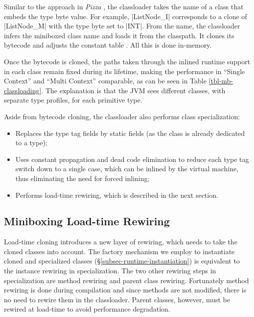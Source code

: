  Similar to the approach in {\em Pizza} \cite{pizza}, the classloader takes the name of a class that embeds the type byte value. For example, |ListNode_I| corresponds to a clone of |ListNode_M| with the type byte set to |INT|. From the name, the classloader infers the miniboxed class name and loads it from the classpath. It clones its bytecode and adjusts the constant table \cite{jsr-202}. All this is done in-memory. 

Once the bytecode is cloned, the paths taken through the inlined runtime support in each class remain fixed during its lifetime, making the performance in ``Single Context'' and ``Multi Context'' comparable, as can be seen in Table \ref{tbl-mb-classloading}. The explanation is that the JVM sees different classes, with separate type profiles, for each primitive type.  

Aside from bytecode cloning, the classloader also performs class specialization:
\begin{itemize}
\item Replaces the type tag fields by static fields (as the class is already dedicated to a type);
\item Uses constant propagation and dead code elimination to reduce each type tag switch down to a single case, which can be inlined by the virtual machine, thus eliminating the need for forced inlining;
\item Performs load-time rewiring, which is described in the next section. 
\end{itemize} 

\subsection{Miniboxing Load-time Rewiring}
\label{subsec-runtime-rewiring}

 Load-time cloning introduces a new layer of rewiring, which needs to take the cloned classes into account. The factory mechanism we employ to instantiate cloned and specialized classes (\S\ref{subsec-runtime-instantiation}) is equivalent to the instance rewiring in specialization. The two other rewiring steps in specialization are method rewiring and parent class rewiring. Fortunately method rewiring is done during compilation and since methods are not modified, there is no need to rewire them in the classloader. Parent classes, however, must be rewired at load-time to avoid performance degradation.  

